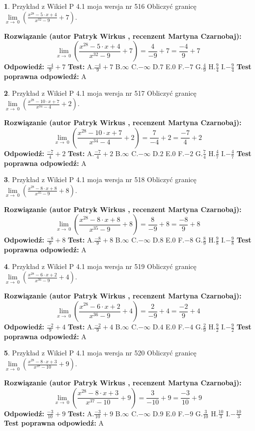 \documentclass[12pt, a4paper]{article}
\theoremstyle{definition} %
\newtheorem{zad}{}
\newcommand{\zadStart}[1]{\begin{zad}#1\newline}
\newcommand{\zadStop}{\end{zad}}
\newcommand{\rozwStart}[2]{\noindent \textbf{Rozwiązanie (autor #1 , recenzent #2): }\newline}
\newcommand{\rozwStop}{\newline}
\newcommand{\odpStart}{\noindent \textbf{Odpowiedź:}\newline}
\newcommand{\odpStop}{\newline}
\newcommand{\testStart}{\noindent \textbf{Test:}\newline}
\newcommand{\testStop}{\newline}
\newcommand{\kluczStart}{\noindent \textbf{Test poprawna odpowiedź:}\newline}
\newcommand{\kluczStop}{\newline}
\begin{document}
\zadStart{Przykład z Wikieł P 4.1 moja wersja nr 516}
Obliczyć granicę $\lim\limits_{x\to\ 0}(\frac{x^{28}-5 \cdot x +4}{x^{32}-9}+7)$.
\zadStop
\rozwStart{Patryk Wirkus}{Martyna Czarnobaj}
$$\lim\limits_{x\to\ 0}(\frac{x^{28}-5 \cdot x +4}{x^{32}-9}+7)=\frac{4}{-9}+7=\frac{-4}{9}+7$$
\rozwStop
\odpStart
$\frac{-4}{9}+7$
\odpStop
\testStart
A.$\frac{-4}{9}+7$
B.$\infty$
C.$-\infty$
D.$7$
E.$0$
F.$-7$
G.$\frac{4}{9}$
H.$\frac{9}{4}$
I.$-\frac{9}{4}$
\testStop
\kluczStart
A
\kluczStop



\zadStart{Przykład z Wikieł P 4.1 moja wersja nr 517}
Obliczyć granicę $\lim\limits_{x\to\ 0}(\frac{x^{28}-10 \cdot x +7}{x^{34}-4}+2)$.
\zadStop
\rozwStart{Patryk Wirkus}{Martyna Czarnobaj}
$$\lim\limits_{x\to\ 0}(\frac{x^{28}-10 \cdot x +7}{x^{34}-4}+2)=\frac{7}{-4}+2=\frac{-7}{4}+2$$
\rozwStop
\odpStart
$\frac{-7}{4}+2$
\odpStop
\testStart
A.$\frac{-7}{4}+2$
B.$\infty$
C.$-\infty$
D.$2$
E.$0$
F.$-2$
G.$\frac{7}{4}$
H.$\frac{4}{7}$
I.$-\frac{4}{7}$
\testStop
\kluczStart
A
\kluczStop



\zadStart{Przykład z Wikieł P 4.1 moja wersja nr 518}
Obliczyć granicę $\lim\limits_{x\to\ 0}(\frac{x^{28}-8 \cdot x +8}{x^{35}-9}+8)$.
\zadStop
\rozwStart{Patryk Wirkus}{Martyna Czarnobaj}
$$\lim\limits_{x\to\ 0}(\frac{x^{28}-8 \cdot x +8}{x^{35}-9}+8)=\frac{8}{-9}+8=\frac{-8}{9}+8$$
\rozwStop
\odpStart
$\frac{-8}{9}+8$
\odpStop
\testStart
A.$\frac{-8}{9}+8$
B.$\infty$
C.$-\infty$
D.$8$
E.$0$
F.$-8$
G.$\frac{8}{9}$
H.$\frac{9}{8}$
I.$-\frac{9}{8}$
\testStop
\kluczStart
A
\kluczStop



\zadStart{Przykład z Wikieł P 4.1 moja wersja nr 519}
Obliczyć granicę $\lim\limits_{x\to\ 0}(\frac{x^{28}-6 \cdot x +2}{x^{36}-9}+4)$.
\zadStop
\rozwStart{Patryk Wirkus}{Martyna Czarnobaj}
$$\lim\limits_{x\to\ 0}(\frac{x^{28}-6 \cdot x +2}{x^{36}-9}+4)=\frac{2}{-9}+4=\frac{-2}{9}+4$$
\rozwStop
\odpStart
$\frac{-2}{9}+4$
\odpStop
\testStart
A.$\frac{-2}{9}+4$
B.$\infty$
C.$-\infty$
D.$4$
E.$0$
F.$-4$
G.$\frac{2}{9}$
H.$\frac{9}{2}$
I.$-\frac{9}{2}$
\testStop
\kluczStart
A
\kluczStop



\zadStart{Przykład z Wikieł P 4.1 moja wersja nr 520}
Obliczyć granicę $\lim\limits_{x\to\ 0}(\frac{x^{28}-8 \cdot x +3}{x^{37}-10}+9)$.
\zadStop
\rozwStart{Patryk Wirkus}{Martyna Czarnobaj}
$$\lim\limits_{x\to\ 0}(\frac{x^{28}-8 \cdot x +3}{x^{37}-10}+9)=\frac{3}{-10}+9=\frac{-3}{10}+9$$
\rozwStop
\odpStart
$\frac{-3}{10}+9$
\odpStop
\testStart
A.$\frac{-3}{10}+9$
B.$\infty$
C.$-\infty$
D.$9$
E.$0$
F.$-9$
G.$\frac{3}{10}$
H.$\frac{10}{3}$
I.$-\frac{10}{3}$
\testStop
\kluczStart
A
\kluczStop
\end{document}
